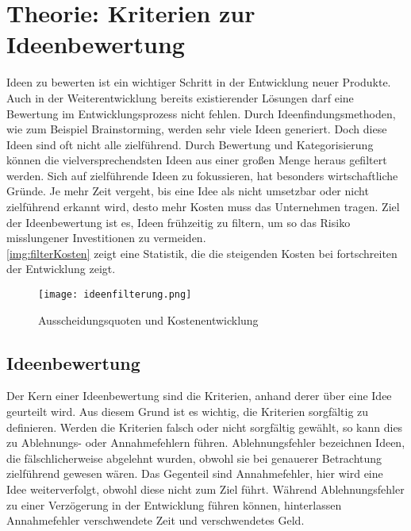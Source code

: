 \newpage
\section{Theorie: Kriterien zur Ideenbewertung}\label{sec:theorie}
Ideen zu bewerten ist ein wichtiger Schritt in der Entwicklung neuer Produkte. 
Auch in der Weiterentwicklung bereits existierender Lösungen darf eine Bewertung im Entwicklungsprozess nicht fehlen. 
Durch Ideenfindungsmethoden, wie zum Beispiel Brainstorming, werden sehr viele Ideen generiert. Doch diese Ideen 
sind oft nicht alle zielführend. 
Durch Bewertung und Kategorisierung können die vielversprechendsten Ideen aus einer großen Menge heraus gefiltert werden. 
Sich auf zielführende Ideen zu fokussieren, hat besonders wirtschaftliche Gründe.
Je mehr Zeit vergeht, bis eine Idee als nicht umsetzbar oder nicht zielführend erkannt wird, desto mehr Kosten muss das Unternehmen tragen.
Ziel der Ideenbewertung ist es, Ideen frühzeitig zu filtern, um so das Risiko misslungener Investitionen zu vermeiden.
\cite{grossklaus:2008}\\
\autoref{img:filterKosten} zeigt eine Statistik, die die steigenden Kosten bei fortschreiten der Entwicklung zeigt. 
\begin{figure}[h]
	\centering
	\texttt{[image: ideenfilterung.png]}
	\caption{Ausscheidungsquoten und Kostenentwicklung}
	\label{img:filterKosten}
\end{figure}

\subsection{Ideenbewertung}
Der Kern einer Ideenbewertung sind die Kriterien, anhand derer über eine Idee geurteilt wird.
Aus diesem Grund ist es wichtig, die Kriterien sorgfältig zu definieren. Werden die Kriterien falsch oder nicht sorgfältig gewählt,
so kann dies zu Ablehnungs- oder Annahmefehlern führen. 
Ablehnungsfehler bezeichnen Ideen, die fälschlicherweise abgelehnt wurden, obwohl sie bei genauerer Betrachtung 
zielführend gewesen wären. Das Gegenteil sind Annahmefehler, hier wird eine Idee weiterverfolgt, obwohl diese nicht zum Ziel führt. 
Während Ablehnungsfehler zu einer Verzögerung in der Entwicklung führen können, hinterlassen Annahmefehler verschwendete Zeit und verschwendetes Geld.\\

